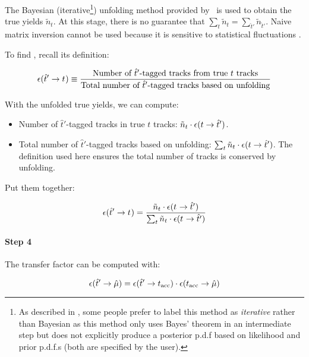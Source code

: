 The Bayesian (iterative\footnote{
    As described in \cite{StatisticalMethods},
    some people prefer to label this method as \emph{iterative} rather
    than Bayesian as this method only uses Bayes' theorem in an intermediate
    step but does not explicitly produce a posterior p.d.f based on
    likelihood and prior p.d.f.s (both are specified by the user).
}) unfolding method provided by \RooUnfold\ is used to
obtain the true yields $\tilde{n}_t$.
At this stage, there is no guarantee that
$\sum_t \tilde{n}_t = \sum_{\hat{t}'} \tilde{n}_{\hat{t}'}$.
Naive matrix inversion cannot be used because it is sensitive to statistical
fluctuations \cite{Cowan_1998}.

To find , recall its definition:

\begin{equation}
    \misEff[\hat{t}']{t^{\phantom{}}} \equiv
        \frac{
            \text{Number of $\hat{t}'$-tagged tracks from true $t$ tracks}
        }{
            \text{Total number of $\hat{t}'$-tagged tracks based on unfolding}
        }
\end{equation}

With the unfolded true yields, we can compute:

\begin{itemize}
    \item Number of $\hat{t}'$-tagged tracks in true $t$ tracks:
        $\tilde{n}_t \cdot \misEff[t]{\hat{t}'}$.
    \item Total number of $\hat{t}'$-tagged tracks based on unfolding:
        $\sum_t \tilde{n}_t \cdot \misEff[t]{\hat{t}'}$.
        The definition used here ensures the total number of tracks is
        conserved by unfolding.
\end{itemize}

Put them together:

\begin{equation}
    \misEff[\hat{t}']{t^{\phantom{}}} =
        \frac{
            \tilde{n}_t \cdot \misEff[t^{\phantom{}}]{\hat{t}'}
        }{
            \sum_t \tilde{n}_t \cdot \misEff[t^{\phantom{}}]{\hat{t}'}
        }
\end{equation}

\paragraph{Step 4}
The transfer factor \misEff[\hat{t}']{\hat{\mu}}
can be computed with:

\begin{equation}
    \misEff[\hat{t}']{\hat{\mu}} =
        \misEff[\hat{t}']{t_\text{acc}} \cdot \misEff[t_\text{acc}]{\hat{\mu}}
\end{equation}

